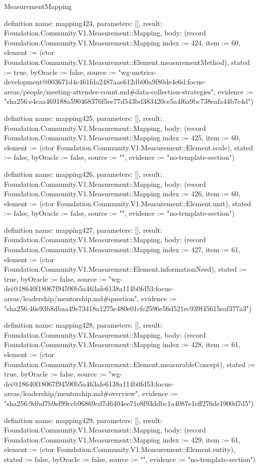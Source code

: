 \begin{lexlean}{MeasurementMapping}
\begin{semanticmodule}
definition{
  name: mapping424,
  parameters: [],
  result: Foundation.Community.V1.Measurement::Mapping,
  body: (record Foundation.Community.V1.Measurement::Mapping {index := 424, item := 60, element := (ctor Foundation.Community.V1.Measurement::Element.measurementMethod), stated := true, byOracle := false, source := "wg-metrics-development@003671d4c461fda2487aae612db00a9f80de4e6d:focus-areas/people/meeting-attendee-count.md#data-collection-strategies", evidence := "sha256:e4caa469188a590468376f5ee77d543bd383420ce5a4f6a9bc738eafa44b7e4d"})
}

definition{
  name: mapping425,
  parameters: [],
  result: Foundation.Community.V1.Measurement::Mapping,
  body: (record Foundation.Community.V1.Measurement::Mapping {index := 425, item := 60, element := (ctor Foundation.Community.V1.Measurement::Element.scale), stated := false, byOracle := false, source := "", evidence := "no-template-section"})
}

definition{
  name: mapping426,
  parameters: [],
  result: Foundation.Community.V1.Measurement::Mapping,
  body: (record Foundation.Community.V1.Measurement::Mapping {index := 426, item := 60, element := (ctor Foundation.Community.V1.Measurement::Element.unit), stated := false, byOracle := false, source := "", evidence := "no-template-section"})
}

definition{
  name: mapping427,
  parameters: [],
  result: Foundation.Community.V1.Measurement::Mapping,
  body: (record Foundation.Community.V1.Measurement::Mapping {index := 427, item := 61, element := (ctor Foundation.Community.V1.Measurement::Element.informationNeed), stated := true, byOracle := false, source := "wg-dei@18640f18067f94590b5a463afe6138a114b0fd53:focus-areas/leadership/mentorship.md#question", evidence := "sha256:46e93b8dbaa49e73418a1275e480e01cfc2596e56d521ec939f45615eaf377a3"})
}

definition{
  name: mapping428,
  parameters: [],
  result: Foundation.Community.V1.Measurement::Mapping,
  body: (record Foundation.Community.V1.Measurement::Mapping {index := 428, item := 61, element := (ctor Foundation.Community.V1.Measurement::Element.measurableConcept), stated := true, byOracle := false, source := "wg-dei@18640f18067f94590b5a463afe6138a114b0fd53:focus-areas/leadership/mentorship.md#overview", evidence := "sha256:9dbd7b9ef99ccb96869cd7d6404ee71e8f93ddbc1a4087e1eff276de1900d7d5"})
}

definition{
  name: mapping429,
  parameters: [],
  result: Foundation.Community.V1.Measurement::Mapping,
  body: (record Foundation.Community.V1.Measurement::Mapping {index := 429, item := 61, element := (ctor Foundation.Community.V1.Measurement::Element.entity), stated := false, byOracle := false, source := "", evidence := "no-template-section"})
}


\end{semanticmodule}
\end{lexlean}
